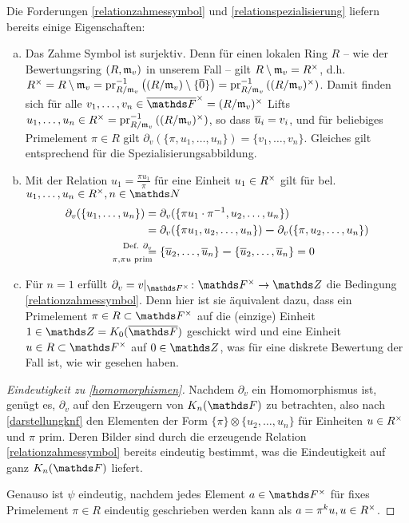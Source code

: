 \documentclass[ngerman,fontsize=11pt, paper=a4, parskip=half, titlepage=true, toc=bib]{scrartcl}
\begin{document}
\begin{Bem}\label{bemhomomorphismen}
  Die Forderungen \ref{relationzahmessymbol} und
  \ref{relationspezialisierung} liefern bereits einige Eigenschaften:
  \begin{enumerate}[a)]
  \item Das Zahme Symbol ist surjektiv. 
    Denn für einen lokalen Ring
    $R$ – wie der Bewertungsring $(R,\mathfrak{m}_v)$ in unserem Fall –
    gilt $R\setminus\mathfrak{m}_v=R^\times$, d.h. $R^\times=R\setminus\mathfrak{m}_v
    =\operatorname{pr}_{R/\mathfrak{m}_v}^{-1}\left((R/\mathfrak{m}_v)\setminus \{\overline0\}\right)
    =\operatorname{pr}_{R/\mathfrak{m}_v}^{-1}\left( (R/\mathfrak{m}_v)^\times\right)$. 
    Damit finden sich für alle 
    $v_1,\dotsc,v_n\in \bFx = (R/\frakm_v)^\times$
    Lifts $u_1,\dotsc, u_n\in R^\times    
    =\operatorname{pr}_{R/\mathfrak{m}_v}^{-1}\left( (R/\mathfrak{m}_v)^\times \right)$,
    so dass $\overline u_i=v_i$, 
    und für beliebiges Primelement $\pi\in R$ gilt
    $\partial_v(\{\pi,u_1,\dotsc, u_n\})=\{v_1,\dotsc, v_n\}$.
    Gleiches gilt entsprechend für die Spezialisierungsabbildung.
  \item   Mit der Relation $u_1=\frac{\pi u_1}{\pi}$
    für eine Einheit $u_1\in R^\times$
    gilt für bel. $u_1,\dotsc, u_n\in \Rx, n\in\N$
    \begin{align*}
      \partial_v(\{u_1,\dotsc,u_n\})
      &= \partial_v(\{\pi u_1\cdot \pi^{-1},u_2,\dotsc,u_n\})\\
      &= \partial_v(\{\pi u_1,u_2,\dotsc,u_n\})\m 
        \partial_v(\{\pi,u_2,\dotsc,u_n\})\\
      &\overset{\mathllap{\text{Def. }\partial_v}}{
        \underset{\mathllap{\pi,\pi u\text{ prim}}}{=}}
        \{\ov u_2,\dotsc, \ov u_n\} \m \{\ov u_2,\dotsc, \ov u_n\}
        = 0
    \end{align*}
  \item Für $n=1$ erfüllt $\partial_v=v|_{\Fx}\colon \Fx\to \Z$ 
    die Bedingung \ref{relationzahmessymbol}.
    Denn hier ist sie äquivalent dazu, dass ein Primelement 
    $\pi\in R\subset \Fx$ auf die (einzige) Einheit $1\in\Z=\K_0(\bF)$ 
    geschickt wird und eine Einheit $u\in R\subset \Fx$ auf $0\in\Z$,
    was für eine diskrete Bewertung der Fall ist, wie wir gesehen haben.
  \end{enumerate}
\end{Bem}

\begin{proof}[Eindeutigkeit zu \ref{homomorphismen}]
  Nachdem $\partial_v$ ein Homomorphismus ist, genügt es, $\partial_v$ auf
  den Erzeugern von $\KnF$ zu betrachten, also nach \ref{darstellungknf} den
  Elementen der Form $\{\pi\}\otimes\{u_{2},\dotsc,u_{n}\}$ für
  Einheiten $u\in R^\times$ und $\pi$ prim.
  Deren Bilder sind durch die erzeugende Relation 
  \ref{relationzahmessymbol} bereits eindeutig
  bestimmt, was die Eindeutigkeit auf ganz $\KnF$ liefert.
  
  Genauso ist $\psi$ eindeutig, nachdem jedes Element $a\in\Fx$ für
  fixes Primelement $\pi\in R$ eindeutig geschrieben werden kann als
  $a=\pi^k u, u\in R^\times$.
\end{proof}
\end{document}

